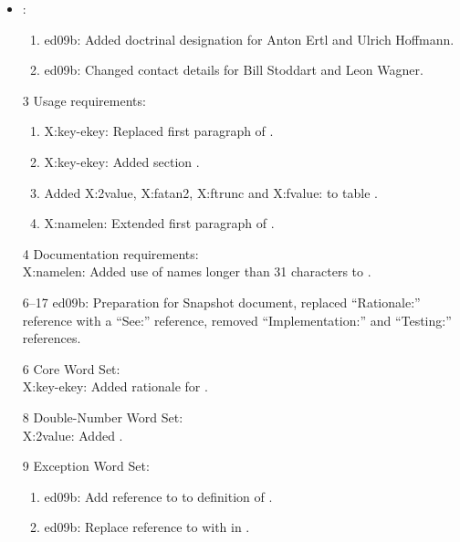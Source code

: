 	\begin{itemize}
	\item {}:
		\begin{enumerate}
		\item \textsf{ed09b}: Added doctrinal designation for Anton Ertl and
			Ulrich Hoffmann.
		\item \textsf{ed09b}: Changed contact details for Bill Stoddart and
			Leon Wagner.
		\end{enumerate}

	\item[3] Usage requirements:
		\begin{enumerate}
		\item \textsf{X:key-ekey}: Replaced first paragraph of
			.
		\item \textsf{X:key-ekey}: Added section
			.
		\item Added \textsf{X:2value}, \textsf{X:fatan2}, \textsf{X:ftrunc}
			and \textsf{X:fvalue:} to table .
		\item \textsf{X:namelen}: Extended first paragraph of
			.
		\end{enumerate}

	\item[4] Documentation requirements: \\
		\textsf{X:namelen}: Added use of names longer than 31
			characters to .

	\item[6--17] \textsf{ed09b}: Preparation for Snapshot document,
		replaced ``Rationale:'' reference with a ``See:'' reference,
		removed ``Implementation:'' and ``Testing:'' references.

	\item[6] Core Word Set: \\
		\textsf{X:key-ekey}: Added rationale for .

	\item[8] Double-Number Word Set: \\
		\textsf{X:2value}: Added .

	\item[9] Exception Word Set:
		\begin{enumerate}
		\item \textsf{ed09b}: Add reference to
			 to definition of
			.

		\item \textsf{ed09b}: Replace reference to
			 with 
			in .
		\end{enumerate}


\end{itemize}
